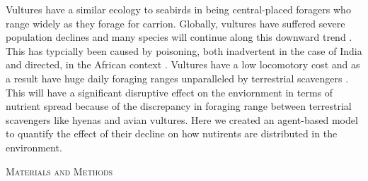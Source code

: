\documentclass[12pt,letterpaper]{article}
\renewcommand{\section}[1]{%
\bigskip
\begin{center}
\begin{Large}
\normalfont\scshape #1
\medskip
\end{Large}
\end{center}}
\begin{document}
Vultures have a similar ecology to seabirds in being central-placed foragers who range widely as they forage for carrion. 
Globally, vultures have suffered severe population declines and many species will continue along this downward trend \cite{ogada2012dropping,CONL12182}.
This has typcially been caused by poisoning, both inadvertent in the case of India and directed, in the African context \cite{ogada2012dropping}. 
Vultures have a low locomotory cost and as a result have huge daily foraging ranges unparalleled by terrestrial scavengers \cite{ruxton2004obligate}. 
This will have a significant disruptive effect on the enviornment in terms of nutrient spread because of the discrepancy in foraging range between terrestrial scavengers like hyenas and avian vultures.
Here we created an agent-based model to quantify the effect of their decline on how nutirents are distributed in the environment. 
%
%
\section{Materials and Methods}
\end{document}
